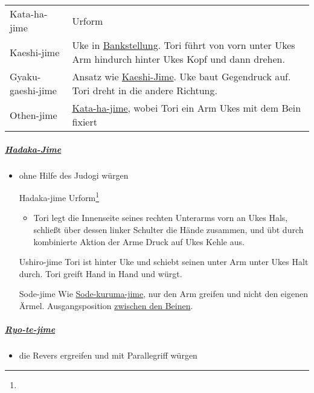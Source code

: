 \documentclass[justified, a4paper, notitlepage, captions=tableheading, nobib]{tufte-handout}
\begin{document}
\begin{center}
\begin{tabular}{ll}
\label{orga25a537}Kata-ha-jime & Urform\footnotemark\\
\label{org16b2d3c}Kaeshi-jime & Uke in \hyperref[org37bd524]{Bankstellung}. Tori führt von vorn unter Ukes Arm hindurch hinter Ukes Kopf und dann drehen.\\
\label{org89c7924}Gyaku-gaeshi-jime & Ansatz wie \hyperref[org16b2d3c]{Kaeshi-Jime}. Uke baut Gegendruck auf. Tori dreht in die andere Richtung.\\
\label{org875df03}Othen-jime & \hyperref[orga25a537]{Kata-ha-jime}, wobei Tori ein Arm Ukes mit dem Bein fixiert\\
\end{tabular}
\end{center}

\subparagraph{\hyperref[orga3070a6]{Hadaka-Jime}}
\label{sec:org728a387}
\begin{itemize}
\item ohne Hilfe des Judogi würgen
\item[{\label{orga3070a6}Hadaka-jime}] Urform\footnote{}                                                                                            
\begin{itemize}
\item Tori legt die Innenseite seines rechten Unterarms vorn an Ukes Hals, schließt über dessen linker Schulter die Hände zusammen, und übt durch kombinierte Aktion der Arme Druck auf Ukes Kehle aus.
\end{itemize}
\item[{\label{org58736a1}Ushiro-jime}] Tori ist hinter Uke und schiebt seinen unter Arm unter Ukes Halt durch. Tori greift Hand in Hand und würgt.
\item[{\label{org917ce4f}Sode-jime  }] Wie \hyperref[org66d000c]{Sode-kuruma-jime}, nur den Arm greifen und nicht den eigenen Ärmel. Ausgangsposition \hyperref[orgf285c69]{zwischen den Beinen}.
\end{itemize}

\subparagraph{\hyperref[org4a903d9]{Ryo-te-jime}}
\label{sec:org9c08af2}
\begin{itemize}
\item die Revers ergreifen und mit Parallegriff würgen
\end{itemize}
\end{document}
